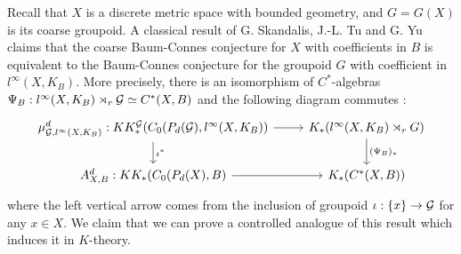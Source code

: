
Recall that $X$ is a discrete metric space with bounded geometry, and $G=G(X)$ is its coarse groupoid. A classical result of G. Skandalis, J.-L. Tu and G. Yu \cite{SkTuYu} claims that the coarse Baum-Connes conjecture for $X$ with coefficients in $B$ is equivalent to the Baum-Connes conjecture for the groupoid $G$ with coefficient in $l^\infty(X,K_B)$. More precisely, there is an isomorphism of $C^*$-algebras $\Psi_B : l^\infty(X,K_B)\rtimes_r \mathcal G \simeq C^*(X,B)$ and the following diagram commutes :
\[\begin{tikzcd}
\mu_{\G,l^\infty(X,K_B)}^d : KK_*^\G(C_0(P_d(\G),l^\infty(X,K_B)) \arrow{r}\arrow{d}{\iota^*}& K_*(l^\infty(X, K_B)\rtimes_r G)\arrow{d}{(\Psi_B)_*}\\
A_{X,B}^d : KK_*(C_0(P_d(X),B) \arrow{r} & K_*(C^*(X,B))
\end{tikzcd}\]
where the left vertical arrow comes from the inclusion of groupoid $\iota :\{x\}\rightarrow \mathcal G$ for any $x\in X$. We claim that we can prove a controlled analogue of this result which induces it in $K$-theory.

